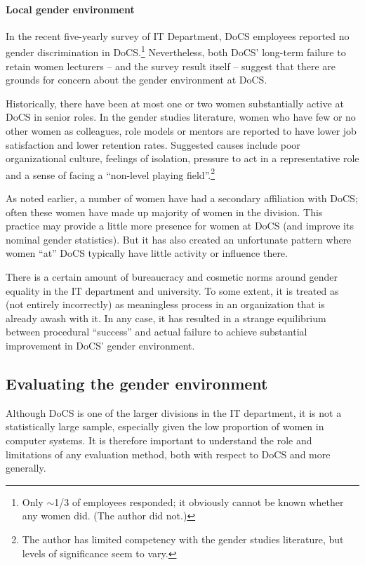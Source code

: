 \documentclass[a4paper,10pt,twocolumn]{article}
\begin{document}

\paragraph{Local gender environment}

In the recent five-yearly survey of IT Department, DoCS employees
reported no gender discrimination in DoCS.\footnote{Only $\sim$1/3 of
employees responded; it obviously cannot be known whether any women
did.  (The author did not.)}  Nevertheless, both DoCS' long-term
failure to retain women lecturers -- and the survey result itself --
suggest that there are grounds for concern about the gender
environment at DoCS.

Historically, there have been at most one or two women substantially
active at DoCS in senior roles. In the gender studies literature,
women who have few or no other women as colleagues, role models or
mentors are reported to have lower job satisfaction and lower
retention rates.  Suggested causes include poor organizational
culture, feelings of isolation, pressure to act in a representative
role and a sense of facing a ``non-level playing field''.\footnote{The
author has limited competency with the gender studies literature, but
levels of significance seem to vary.\label{disclaimer}}

As noted earlier, a number of women have had a secondary affiliation
with DoCS; often these women have made up majority of women in the
division.  This practice may provide a little more presence for women
at DoCS (and improve its nominal gender statistics).  But it has also
created an unfortunate pattern where women ``at'' DoCS typically have
little activity or influence there.

There is a certain amount of bureaucracy and cosmetic norms around
gender equality in the IT department and university.  To some extent,
it is treated as (not entirely incorrectly) as meaningless process in
an organization that is already awash with it.  In any case, it has
resulted in a strange equilibrium between procedural ``success'' and
actual failure to achieve substantial improvement in DoCS' gender
environment.

\subsection*{Evaluating the gender environment}

Although DoCS is one of the larger divisions in the IT department, it
is not a statistically large sample, especially given the low
proportion of women in computer systems.  It is therefore important to
understand the role and limitations of any evaluation method, both
with respect to DoCS and more generally.
\end{document}

